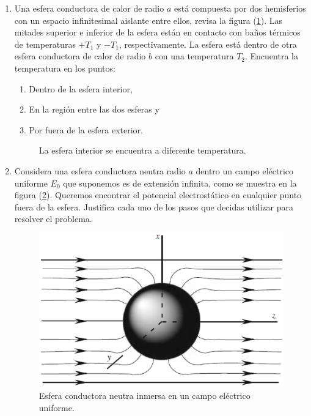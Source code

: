 \begin{enumerate}
\item Una esfera conductora de calor de radio $a$ está compuesta por dos hemisferios con un espacio infinitesimal aislante entre ellos, revisa la figura (\ref{fig:figura2}). Las mitades superior e inferior de la esfera están en contacto con baños térmicos de temperaturas $+ T_{1}$ y $-T_{1}$, respectivamente. La esfera está dentro de otra esfera conductora de calor de radio $b$ con una temperatura $T_{2}$. Encuentra la temperatura en los puntos:
\begin{enumerate}[label=\alph*)]
\item Dentro de la esfera interior,
\item En la región entre las dos esferas y
\item Por fuera de la esfera exterior.
\end{enumerate} 
\begin{figure}[!ht]
\centering

\caption{La esfera interior se encuentra a diferente temperatura.}
\label{fig:figura2}
\end{figure}
\item Considera una esfera conductora neutra radio $a$ dentro un campo eléctrico uniforme  $E_{0}$ que suponemos es de extensión infinita, como se muestra en la figura (\ref{fig:figura3}). Queremos encontrar el potencial electrostático en cualquier punto fuera de la esfera. Justifica cada uno de los pasos que decidas utilizar para resolver el problema.
\begin{figure}[!ht]
\centering
\includegraphics[scale=0.5]{Esfera_Tarea5.eps}
\caption{Esfera conductora neutra inmersa en un campo eléctrico uniforme.}
\label{fig:figura3}
\end{figure}

\end{enumerate}
